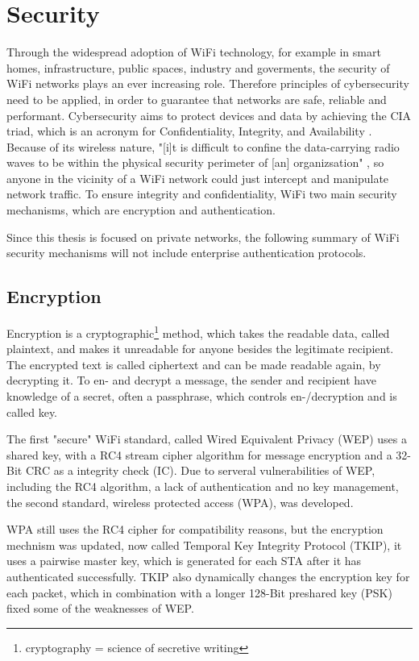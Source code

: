 \section{Security}

Through the widespread adoption of WiFi technology, for example in smart homes, infrastructure, public spaces, industry and goverments, the security of WiFi networks plays an ever increasing role.
Therefore principles of cybersecurity need to be applied, in order to guarantee that networks are safe, reliable and performant.
Cybersecurity aims to protect devices and data by achieving the CIA triad, which is an acronym for Confidentiality, Integrity, and Availability \cite{Oriyano_2017} .
Because of its wireless nature, "[i]t is difficult to confine the data-carrying radio waves to be within the physical security perimeter of [an] organizsation" \cite[page~103]{Sankaran_Gulasekaran_2021}, so anyone in the vicinity of a WiFi network could just intercept and manipulate network traffic.
To ensure integrity and confidentiality, WiFi two main security mechanisms, which are encryption and authentication. \cite[page~103]{Sankaran_Gulasekaran_2021}

Since this thesis is focused on private networks, the following summary of WiFi security mechanisms will not include enterprise authentication protocols.
    
\subsection{Encryption}
Encryption is a cryptographic\footnote{cryptography = science of secretive writing} method, which takes the readable data, called plaintext, and makes it unreadable for anyone besides the legitimate recipient.
The encrypted text is called ciphertext and can be made readable again, by decrypting it.
To en- and decrypt a message, the sender and recipient have knowledge of a secret, often a passphrase, which controls en-/decryption and is called key. \cite[page~1]{Watjen_2018}

The first "secure" WiFi standard, called Wired Equivalent Privacy (WEP) uses a shared key, with a RC4 stream cipher algorithm for message encryption and a 32-Bit CRC as a integrity check (IC).
Due to serveral vulnerabilities of WEP, including the RC4 algorithm, a lack of authentication and no key management, the second standard, wireless protected access (WPA), was developed.

WPA still uses the RC4 cipher for compatibility reasons, but the encryption mechnism was updated, now called Temporal Key Integrity Protocol (TKIP), it uses a pairwise master key, which is generated for each STA after it has authenticated successfully.
TKIP also dynamically changes the encryption key for each packet, which in combination with a longer 128-Bit preshared key (PSK) fixed some of the weaknesses of WEP. \cite{Oriyano_2017}

